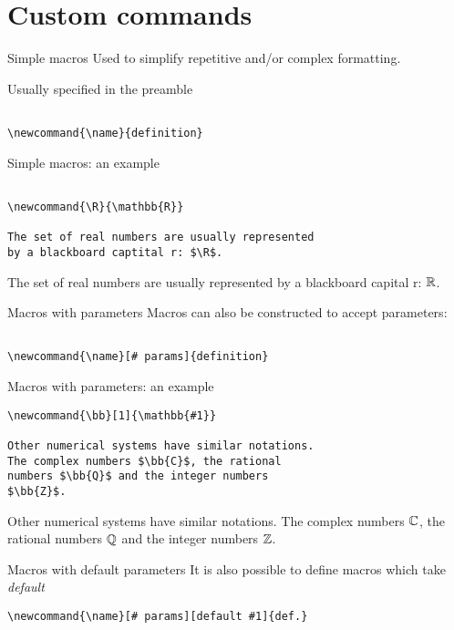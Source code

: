 \section{Custom commands}

\begin{frame}[fragile]{Simple macros}
Used to simplify repetitive and/or complex formatting.

Usually specified in the preamble
\begin{lstlisting}

\newcommand{\name}{definition}
\end{lstlisting}
\end{frame}

\begin{frame}[fragile]{Simple macros: an example}
\begin{lstlisting}

\newcommand{\R}{\mathbb{R}}

The set of real numbers are usually represented
by a blackboard captital r: $\R$.
\end{lstlisting}

The set of real numbers are usually represented by a blackboard capital r:
$\R$.
\end{frame}

\begin{frame}[fragile]{Macros with parameters}
Macros can also be constructed to accept parameters:
\begin{lstlisting}

\newcommand{\name}[# params]{definition}
\end{lstlisting}
\end{frame}

\begin{frame}[fragile]{Macros with parameters: an example}
\begin{lstlisting}
\newcommand{\bb}[1]{\mathbb{#1}}

Other numerical systems have similar notations. 
The complex numbers $\bb{C}$, the rational 
numbers $\bb{Q}$ and the integer numbers
$\bb{Z}$.

\end{lstlisting}
Other numerical systems have similar notations. The complex numbers $\bb{C}$,
the rational numbers $\bb{Q}$ and the integer numbers $\bb{Z}$.
\end{frame}

\begin{frame}[fragile]{Macros with default parameters}
It is also possible to define macros which take \textsl{default}
\begin{lstlisting}
\newcommand{\name}[# params][default #1]{def.}

\end{lstlisting}
\end{frame}

